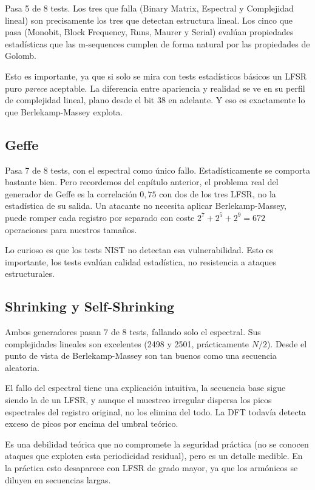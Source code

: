 Pasa 5 de 8 tests. Los tres que falla (Binary Matrix, Espectral y Complejidad lineal)
son precisamente los tres que detectan estructura lineal. Los cinco que pasa (Monobit, Block Frequency, Runs, Maurer y Serial)
evalúan propiedades estadísticas que las m-sequences cumplen de forma natural por las propiedades de Golomb.

Esto es importante, ya que si solo se mira con tests estadísticos básicos un LFSR puro \textit{parece} aceptable.
La diferencia entre apariencia y realidad se ve en su perfil de complejidad lineal, plano desde el bit 38 en adelante.
Y eso es exactamente lo que Berlekamp-Massey explota.

\subsection{Geffe}

Pasa 7 de 8 tests, con el espectral como único fallo. Estadísticamente se comporta bastante bien.
Pero recordemos del capítulo anterior, el problema real del generador de Geffe es la correlación $0{,}75$ con dos de los tres LFSR,
no la estadística de su salida. Un atacante no necesita aplicar Berlekamp-Massey,
puede romper cada registro por separado con coste $2^7 + 2^5 + 2^9 = 672$ operaciones para nuestros tamaños.

Lo curioso es que los tests NIST no detectan esa vulnerabilidad. Esto es importante, los tests evalúan calidad estadística,
no resistencia a ataques estructurales.

\subsection{Shrinking y Self-Shrinking}

Ambos generadores pasan 7 de 8 tests, fallando solo el espectral. Sus complejidades lineales son excelentes (2498 y 2501, prácticamente $N/2$).
Desde el punto de vista de Berlekamp-Massey son tan buenos como una secuencia aleatoria.

El fallo del espectral tiene una explicación intuitiva, la secuencia base sigue siendo la de un LFSR,
y aunque el muestreo irregular dispersa los picos espectrales del registro original,
no los elimina del todo. La DFT todavía detecta exceso de picos por encima del umbral teórico.

Es una debilidad teórica que no compromete la seguridad práctica (no se conocen ataques que exploten esta periodicidad residual),
pero es un detalle medible. En la práctica esto desaparece con LFSR de grado mayor, ya que los armónicos se diluyen en secuencias largas.

